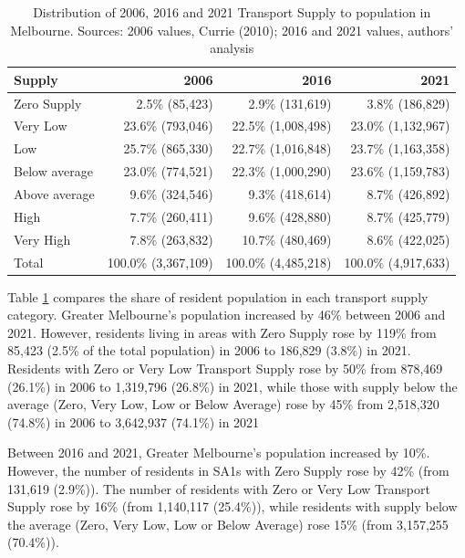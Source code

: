 \documentclass[preprint, 3p,
authoryear]{elsarticle} %
\begin{document}
\begin{table}

\caption{\label{tab:Greater_Melbourne_CCDs_SA1_population}Distribution of 2006, 2016 and 2021 Transport Supply to population in Melbourne. Sources: 2006 values, Currie (2010); 2016 and 2021 values, authors' analysis}
\centering
\begin{tabular}[t]{l|r|r|r}
\hline
Supply & 2006 & 2016 & 2021\\
\hline
Zero Supply & 2.5\%    (85,423) & 2.9\%   (131,619) & 3.8\%   (186,829)\\
\hline
Very Low & 23.6\%   (793,046) & 22.5\% (1,008,498) & 23.0\% (1,132,967)\\
\hline
Low & 25.7\%   (865,330) & 22.7\% (1,016,848) & 23.7\% (1,163,358)\\
\hline
Below average & 23.0\%   (774,521) & 22.3\% (1,000,290) & 23.6\% (1,159,783)\\
\hline
Above average & 9.6\%   (324,546) & 9.3\%   (418,614) & 8.7\%   (426,892)\\
\hline
High & 7.7\%   (260,411) & 9.6\%   (428,880) & 8.7\%   (425,779)\\
\hline
Very High & 7.8\%   (263,832) & 10.7\%   (480,469) & 8.6\%   (422,025)\\
\hline
Total & 100.0\% (3,367,109) & 100.0\% (4,485,218) & 100.0\% (4,917,633)\\
\hline
\end{tabular}
\end{table}

Table \ref{tab:Greater_Melbourne_CCDs_SA1_population} compares the share
of resident population in each transport supply category. Greater
Melbourne's population increased by 46\% between 2006 and 2021. However,
residents living in areas with Zero Supply rose by 119\% from 85,423
(2.5\% of the total population) in 2006 to 186,829 (3.8\%) in 2021.
Residents with Zero or Very Low Transport Supply rose by 50\% from
878,469 (26.1\%) in 2006 to 1,319,796 (26.8\%) in 2021, while those with
supply below the average (Zero, Very Low, Low or Below Average) rose by
45\% from 2,518,320 (74.8\%) in 2006 to 3,642,937 (74.1\%) in 2021

Between 2016 and 2021, Greater Melbourne's population increased by 10\%.
However, the number of residents in SA1s with Zero Supply rose by 42\%
(from 131,619 (2.9\%)). The number of residents with Zero or Very Low
Transport Supply rose by 16\% (from 1,140,117 (25.4\%)), while residents
with supply below the average (Zero, Very Low, Low or Below Average)
rose 15\% (from 3,157,255 (70.4\%)).
\end{document}

